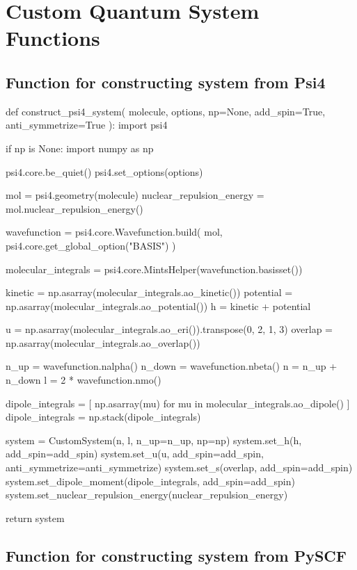 \chapter{Custom Quantum System Functions}

\section{Function for constructing system from Psi4}
\label{sec:custom_system_psi4}

\begin{python}
def construct_psi4_system(
    molecule, options, np=None, add_spin=True, anti_symmetrize=True
):
    import psi4

    if np is None:
        import numpy as np

    psi4.core.be_quiet()
    psi4.set_options(options)

    mol = psi4.geometry(molecule)
    nuclear_repulsion_energy = mol.nuclear_repulsion_energy()

    wavefunction = psi4.core.Wavefunction.build(
        mol, psi4.core.get_global_option("BASIS")
    )

    molecular_integrals = psi4.core.MintsHelper(wavefunction.basisset())

    kinetic = np.asarray(molecular_integrals.ao_kinetic())
    potential = np.asarray(molecular_integrals.ao_potential())
    h = kinetic + potential

    u = np.asarray(molecular_integrals.ao_eri()).transpose(0, 2, 1, 3)
    overlap = np.asarray(molecular_integrals.ao_overlap())

    n_up = wavefunction.nalpha()
    n_down = wavefunction.nbeta()
    n = n_up + n_down
    l = 2 * wavefunction.nmo()

    dipole_integrals = [
        np.asarray(mu) for mu in molecular_integrals.ao_dipole()
    ]
    dipole_integrals = np.stack(dipole_integrals)

    system = CustomSystem(n, l, n_up=n_up, np=np)
    system.set_h(h, add_spin=add_spin)
    system.set_u(u, add_spin=add_spin, anti_symmetrize=anti_symmetrize)
    system.set_s(overlap, add_spin=add_spin)
    system.set_dipole_moment(dipole_integrals, add_spin=add_spin)
    system.set_nuclear_repulsion_energy(nuclear_repulsion_energy)

    return system
\end{python}

\section{Function for constructing system from PySCF}
\label{sec:custom_system_pyscf}

